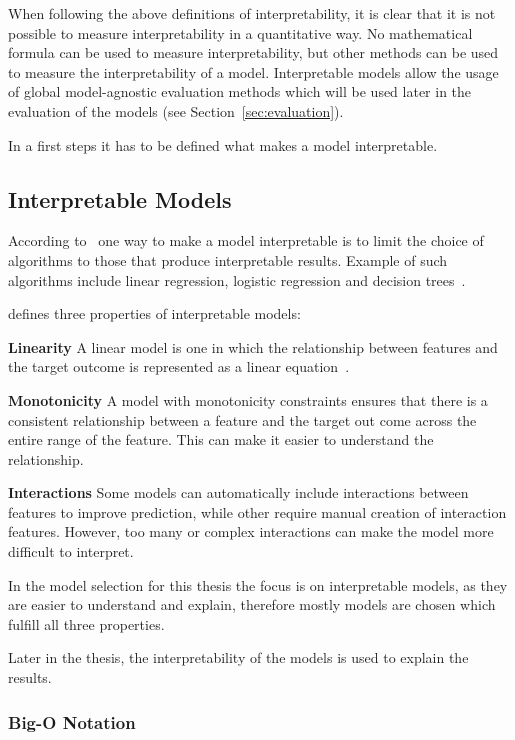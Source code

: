 When following the above definitions of interpretability, it is clear that it is not possible to
measure interpretability in a quantitative way.
No mathematical formula can be used to measure interpretability, but other methods can be used to
measure the interpretability of a model.
Interpretable models allow the usage of global model-agnostic evaluation methods which will be
used later in the evaluation of the models (see Section~\ref{sec:evaluation}).

In a first steps it has to be defined what makes a model interpretable.

\subsection*{Interpretable Models}
According to~\cite{molnar2020interpretable} one way to make a model interpretable is to limit the
choice of algorithms to those that produce interpretable results. Example of such
algorithms include linear regression, logistic regression and decision trees~\cite[p.
35]{molnar2020interpretable}.

\cite{molnar2020interpretable} defines three properties of interpretable models:

\textbf{Linearity} A linear model is one in which the relationship between features and the
target outcome is represented as a linear equation~\cite[]{molnar2020interpretable}.

\textbf{Monotonicity} A model with monotonicity constraints ensures that there is a consistent
relationship between a feature and the target out come across the entire range of the feature.
This can make it easier to understand the relationship.

\textbf{Interactions} Some models can automatically include
interactions between features to improve prediction, while other require manual creation of
interaction features.
However, too many or complex interactions can make the model more
difficult to interpret.

In the model selection for this thesis the focus is on interpretable models, as they are easier to
understand and explain, therefore mostly models are chosen which fulfill all three
properties.

Later in the thesis, the interpretability of the models is used to explain the results.

\subsubsection*{Big-O Notation}

